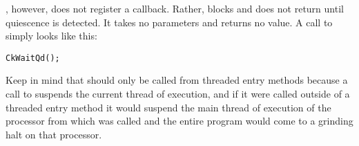 , however, does not register a callback.  Rather,
 blocks and does not return until quiescence is
detected.  It takes no parameters and returns no value.  A call to
 simply looks like this: 

\begin{alltt}
  CkWaitQd();
\end{alltt}

Keep in mind that  should only be called from threaded
entry methods because a call to  suspends the
current thread of execution, and if it were called outside of a threaded entry
method it would suspend the main thread of execution of the processor from
which  was called and the entire program would come to a grinding
halt on that processor.
